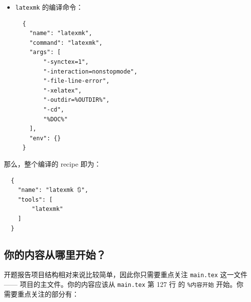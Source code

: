 \begin{itemize}
  \item \texttt{latexmk} 的编译命令：
  \begin{verbatim}
  {
    "name": "latexmk",
    "command": "latexmk",
    "args": [
        "-synctex=1",
        "-interaction=nonstopmode",
        "-file-line-error",
        "-xelatex",
        "-outdir=%OUTDIR%",
        "-cd",
        "%DOC%"
    ],
    "env": {}
  }
  \end{verbatim}
\end{itemize}

那么，整个编译的 recipe 即为：
\begin{verbatim}
  {
    "name": "latexmk 🔃",
    "tools": [
        "latexmk"
    ]
  }
\end{verbatim}

\subsection{你的内容从哪里开始？}
开题报告项目结构相对来说比较简单，因此你只需要重点关注 \texttt{main.tex} 这一文件 —— 项目的主文件。你的内容应该从 \texttt{main.tex} 第 127 行 的 \texttt{\%内容开始} 开始。你需要重点关注的部分有：

\begin{table}[H]
\centering
\caption{开题报告内容概要}
\label{tab:proposalreport}
\end{table}

